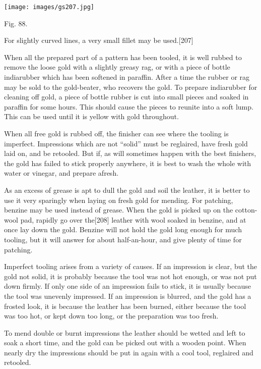 \documentclass[
]{article}
\begin{document}
\protect\hypertarget{Fig_88}{}{}
\texttt{[image: images/gs207.jpg]}

Fig. 88.

For slightly curved lines, a very small fillet may be
used.{\protect\hypertarget{Page_207}{}{{[}207{]}}}

When all the prepared part of a pattern has been tooled, it is well
rubbed to remove the loose gold with a slightly greasy rag, or with a
piece of bottle indiarubber which has been softened in paraffin. After a
time the rubber or rag may be sold to the gold-beater, who recovers the
gold. To prepare indiarubber for cleaning off gold, a piece of bottle
rubber is cut into small pieces and soaked in paraffin for some hours.
This should cause the pieces to reunite into a soft lump. This can be
used until it is yellow with gold throughout.

When all free gold is rubbed off, the finisher can see where the tooling
is imperfect. Impressions which are not ``solid'' must be reglaired,
have fresh gold laid on, and be retooled. But if, as will sometimes
happen with the best finishers, the gold has failed to stick properly
anywhere, it is best to wash the whole with water or vinegar, and
prepare afresh.

As an excess of grease is apt to dull the gold and soil the leather, it
is better to use it very sparingly when laying on fresh gold for
mending. For patching, benzine may be used instead of grease. When the
gold is picked up on the cotton-wool pad, rapidly go over
the{\protect\hypertarget{Page_208}{}{{[}208{]}}} leather with wool
soaked in benzine, and at once lay down the gold. Benzine will not hold
the gold long enough for much tooling, but it will answer for about
half-an-hour, and give plenty of time for patching.

Imperfect tooling arises from a variety of causes. If an impression is
clear, but the gold not solid, it is probably because the tool was not
hot enough, or was not put down firmly. If only one side of an
impression fails to stick, it is usually because the tool was unevenly
impressed. If an impression is blurred, and the gold has a frosted look,
it is because the leather has been burned, either because the tool was
too hot, or kept down too long, or the preparation was too fresh.

To mend double or burnt impressions the leather should be wetted and
left to soak a short time, and the gold can be picked out with a wooden
point. When nearly dry the impressions should be put in again with a
cool tool, reglaired and retooled.
\end{document}
